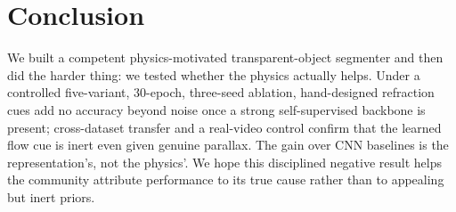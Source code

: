 \section{Conclusion}
We built a competent physics-motivated transparent-object segmenter and then did
the harder thing: we tested whether the physics actually helps. Under a
controlled five-variant, 30-epoch, three-seed ablation, hand-designed refraction
cues add no accuracy beyond noise once a strong self-supervised backbone is
present; cross-dataset transfer and a real-video control confirm that the
learned flow cue is inert even given genuine parallax. The gain over CNN
baselines is the representation's, not the physics'. We hope this disciplined
negative result helps the community attribute performance to its true cause
rather than to appealing but inert priors.

